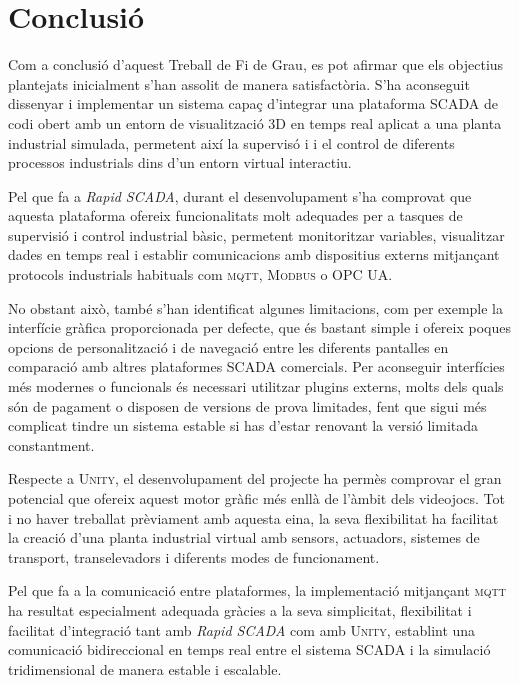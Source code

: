 \documentclass[a4paper,11pt,DIV=13,headings=normal,abstract=true,twoside=semi]{article}
\newcommand{\acro}[1]{\textsc{#1}}
\begin{document}
\newpage

\section{Conclusió}

Com a conclusió d'aquest Treball de Fi de Grau, es pot afirmar que els objectius plantejats inicialment s'han assolit de manera satisfactòria. S'ha aconseguit dissenyar i implementar un sistema capaç d'integrar una plataforma \acro{SCADA} de codi obert amb un entorn de visualització 3D en temps real aplicat a una planta industrial simulada, permetent així la supervisó i i el control de diferents processos industrials dins d'un entorn virtual interactiu.

Pel que fa a \emph{Rapid SCADA}, durant el desenvolupament s'ha comprovat que aquesta plataforma ofereix funcionalitats molt adequades per a tasques de supervisió i control industrial bàsic, permetent monitoritzar variables, visualitzar dades en temps real i establir comunicacions amb dispositius externs mitjançant protocols industrials habituals com \acro{mqtt}, \acro{Modbus} o \acro{OPC UA}.

No obstant això, també s'han identificat algunes limitacions, com per exemple la interfície gràfica proporcionada per defecte, que és bastant simple i ofereix poques opcions de personalització i de navegació entre les diferents pantalles en comparació amb altres plataformes \acro{SCADA} comercials. Per aconseguir interfícies més modernes o funcionals és necessari utilitzar plugins externs, molts dels quals són de pagament o disposen de versions de prova limitades, fent que sigui més complicat tindre un sistema estable si has d'estar renovant la versió limitada constantment. 

Respecte a \acro{Unity}, el desenvolupament del projecte ha permès comprovar el gran potencial que ofereix aquest motor gràfic més enllà de l'àmbit dels videojocs. Tot i no haver treballat prèviament amb aquesta eina, la seva flexibilitat ha facilitat la creació d'una planta industrial virtual amb sensors, actuadors, sistemes de transport, transelevadors i diferents modes de funcionament. 

Pel que fa a la comunicació entre plataformes, la implementació mitjançant \acro{mqtt} ha resultat especialment adequada gràcies a la seva simplicitat, flexibilitat i facilitat d'integració tant amb \emph{Rapid SCADA} com amb \acro{Unity}, establint una comunicació bidireccional en temps real entre el sistema \acro{SCADA} i la simulació tridimensional de manera estable i escalable.
\end{document}
